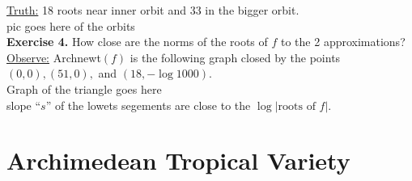 \documentclass[]{article}
\theoremstyle{definition}
\begin{document}
			\underline{Truth:} 18 roots near inner orbit and 33 in the bigger orbit.\\
			
			\vspace{.25in}
				pic goes here of the orbits			
			\vspace{.25in}\\
			
			\textbf{Exercise 4.} How close are the norms of the roots of $f$ to the 2 approximations?\\
			
			\underline{Observe:} Archnewt$(f)$ is the following graph closed by the points $(0,0),(51,0),$ and $(18,-\log1000)$.\\
			
			\vspace{.25in}
			Graph of the triangle goes here
			\vspace{.25in}\\
			slope ``$s$'' of the lowets segements are close to the $\log|\text{roots of $f$|}$.
			
			\section{Archimedean Tropical Variety}
\end{document}
